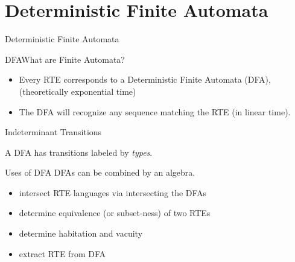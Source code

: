 \section{Deterministic Finite Automata}

\begin{frame}{Deterministic Finite Automata}
\end{frame}


\begin{frame}{DFA}{What are Finite Automata?}
  \begin{itemize}
  \item   Every RTE corresponds to a Deterministic Finite Automata (DFA),  (theoretically exponential time)

  \item   The DFA will recognize any sequence matching the RTE (in linear time).

  \end{itemize}
\end{frame}

\begin{frame}{Indeterminant Transitions}

  \scalebox{0.7}{}

   A DFA has transitions labeled by \emph{types}.
\end{frame}



\begin{frame}{Uses of DFA}
  DFAs can be combined by an algebra.

  \begin{itemize}
  \item intersect RTE languages via intersecting the DFAs
  \item determine equivalence (or subset-ness) of two RTEs
  \item determine habitation and vacuity
  \item extract RTE from DFA
  \end{itemize}
\end{frame}
